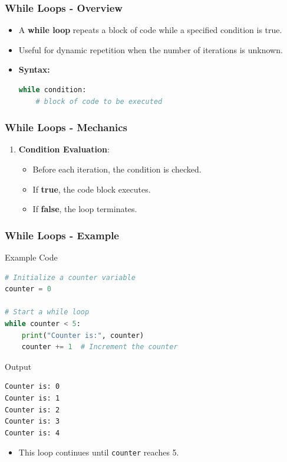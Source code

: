 \documentclass{beamer}
\begin{document}
\begin{frame}[fragile]
    \frametitle{While Loops - Overview}
    \begin{itemize}
        \item A \textbf{while loop} repeats a block of code while a specified condition is true.
        \item Useful for dynamic repetition when the number of iterations is unknown.
        \item \textbf{Syntax:}
        \begin{lstlisting}[language=Python]
while condition:
    # block of code to be executed
        \end{lstlisting}
    \end{itemize}
\end{frame}

\begin{frame}[fragile]
    \frametitle{While Loops - Mechanics}
    \begin{enumerate}
        \item \textbf{Condition Evaluation}:
            \begin{itemize}
                \item Before each iteration, the condition is checked.
                \item If \textbf{true}, the code block executes.
                \item If \textbf{false}, the loop terminates.
            \end{itemize}
    \end{enumerate}
\end{frame}

\begin{frame}[fragile]
    \frametitle{While Loops - Example}
    \begin{block}{Example Code}
        \begin{lstlisting}[language=Python]
# Initialize a counter variable
counter = 0

# Start a while loop
while counter < 5:
    print("Counter is:", counter)
    counter += 1  # Increment the counter
        \end{lstlisting}
    \end{block}
    \begin{block}{Output}
        \begin{lstlisting}
Counter is: 0
Counter is: 1
Counter is: 2
Counter is: 3
Counter is: 4
        \end{lstlisting}
    \end{block}
    \begin{itemize}
        \item This loop continues until \texttt{counter} reaches 5.
    \end{itemize}
\end{frame}
\end{document}
